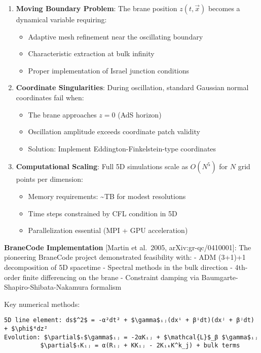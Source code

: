 \documentclass[
  11pt,
]{report}
\providecommand{\tightlist}{%
  \setlength{\itemsep}{0pt}\setlength{\parskip}{0pt}}
\begin{document}
\begin{enumerate}
\def\labelenumi{\arabic{enumi}.}
\tightlist
\item
  \textbf{Moving Boundary Problem}: The brane position \(z(t,\vec{x})\)
  becomes a dynamical variable requiring:

  \begin{itemize}
  \tightlist
  \item
    Adaptive mesh refinement near the oscillating boundary
  \item
    Characteristic extraction at bulk infinity
  \item
    Proper implementation of Israel junction conditions
  \end{itemize}
\item
  \textbf{Coordinate Singularities}: During oscillation, standard
  Gaussian normal coordinates fail when:

  \begin{itemize}
  \tightlist
  \item
    The brane approaches \(z = 0\) (AdS horizon)
  \item
    Oscillation amplitude exceeds coordinate patch validity
  \item
    Solution: Implement Eddington-Finkelstein-type coordinates
  \end{itemize}
\item
  \textbf{Computational Scaling}: Full 5D simulations scale as
  \(O(N^5)\) for \(N\) grid points per dimension:

  \begin{itemize}
  \tightlist
  \item
    Memory requirements: \textasciitilde TB for modest resolutions
  \item
    Time steps constrained by CFL condition in 5D
  \item
    Parallelization essential (MPI + GPU acceleration)
  \end{itemize}
\end{enumerate}

\textbf{BraneCode Implementation} {[}Martin et al.~2005,
arXiv:gr-qc/0410001{]}: The pioneering BraneCode project demonstrated
feasibility with: - ADM (3+1)+1 decomposition of 5D spacetime - Spectral
methods in the bulk direction - 4th-order finite differencing on the
brane - Constraint damping via Baumgarte-Shapiro-Shibata-Nakamura
formalism

Key numerical methods:

\begin{verbatim}
5D line element: ds$^2$ = -α²dt² + $\gamma$ᵢⱼ(dxⁱ + βⁱdt)(dxʲ + βʲdt) + $\phi$⁴dz²
Evolution: $\partial$ₜ$\gamma$ᵢⱼ = -2αKᵢⱼ + $\mathcal{L}$_β $\gamma$ᵢⱼ
          $\partial$ₜKᵢⱼ = α(Rᵢⱼ + KKᵢⱼ - 2KᵢₖK^k_j) + bulk terms
\end{verbatim}
\end{document}
